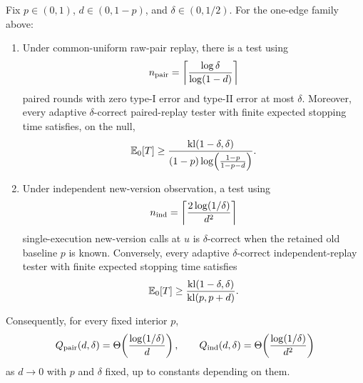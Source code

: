 \begin{theorem}
\label{thm:bernoulli-separation}
Fix $p\in(0,1)$, $d\in(0,1-p)$, and $\delta\in(0,1/2)$.  For the one-edge family above:

\begin{enumerate}[label=(\roman*)]
\item Under common-uniform raw-pair replay, there is a test using
\[
n_{\rm pair}
=
\left\lceil
\frac{\log \delta}{\log(1-d)}
\right\rceil
\]
paired rounds with zero type-I error and type-II error at most $\delta$.
Moreover, every adaptive $\delta$-correct paired-replay tester with finite
expected stopping time satisfies, on the null,
\[
\mathbb{E}_0[T]
\ge
\frac{\mathrm{kl}(1-\delta,\delta)}
{(1-p)\log\!\left(\frac{1-p}{1-p-d}\right)}.
\]

\item Under independent new-version observation, a test using
\[
n_{\rm ind}
=
\left\lceil
\frac{2\log(1/\delta)}{d^2}
\right\rceil
\]
single-execution new-version calls at $u$ is $\delta$-correct when the retained old baseline
$p$ is known.  Conversely, every adaptive $\delta$-correct independent-replay
tester with finite expected stopping time satisfies
\[
\mathbb{E}_0[T]
\ge
\frac{\mathrm{kl}(1-\delta,\delta)}
{\mathrm{kl}(p,p+d)}.
\]
\end{enumerate}

Consequently, for every fixed interior $p$,
\[
Q_{\rm pair}(d,\delta)
=
\Theta\!\left(
\frac{\log(1/\delta)}{d}
\right),
\qquad
Q_{\rm ind}(d,\delta)
=
\Theta\!\left(
\frac{\log(1/\delta)}{d^2}
\right)
\]
as $d\to0$ with $p$ and $\delta$ fixed, up to constants depending on them.
\end{theorem}

